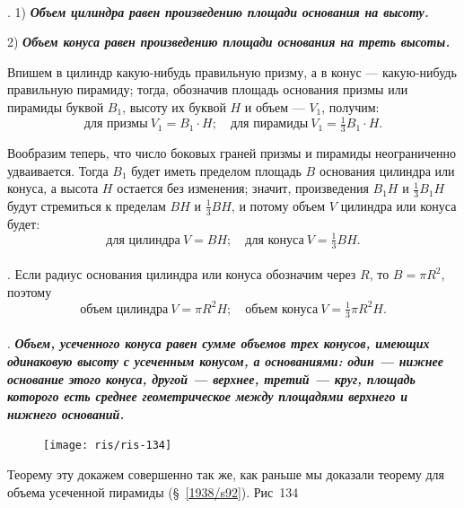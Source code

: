 \documentclass[twoside]{book}
\begin{document}
\paragraph{}\label{1938/s120}
.
1) \textbf{\emph{Объем цилиндра равен произведению площади основания на высоту.}}

2) \textbf{\emph{Объем конуса равен произведению площади основания на треть высоты.}}

Впишем в цилиндр какую-нибудь правильную призму, а в конус --- какую-нибудь правильную пирамиду;
тогда, обозначив площадь основания призмы или пирамиды буквой $B_1$, высоту их буквой $H$ и объем --- $V_1$, получим:
\[
\text{для призмы}\  V_1 = B_1\cdot H;\quad
\text{для пирамиды}\  V_1= \tfrac13 B_1\cdot H.
\]

Вообразим теперь, что число боковых граней призмы и пирамиды неограниченно удваивается.
Тогда $B_1$ будет иметь пределом площадь $B$ основания цилиндра или конуса, а высота $H$ остается без изменения;
значит, произведения $B_1H$ и $\tfrac13B_1H$ будут стремиться к пределам $BH$ и $\tfrac13BH$, и потому объем $V$ цилиндра или конуса будет:
\[
\text{для цилиндра}\  V = B H;\quad
\text{для конуса}\  V= \tfrac13 B H.
\]

\paragraph{}\label{1938/s121}
.
Если радиус основания цилиндра или конуса обозначим через $R$, то $B= \pi R^2$, поэтому 
\[
\text{объем цилиндра}\ V = \pi R^2H;
\quad
\text{объем конуса}\ V = \tfrac13\pi R^2H.\]

\paragraph{}\label{1938/s122}
.
\textbf{\emph{Объем, усеченного конуса равен сумме объемов трех конусов, имеющих одинаковую высоту с усеченным конусом, а основаниями: один --- нижнее основание этого конуса, другой --- верхнее, третий --- круг, площадь которого есть среднее геометрическое между площадями верхнего и нижнего оснований.}}

\begin{figure}[h!]
\centering
\texttt{[image: ris/ris-134]}
\caption{}
\end{figure}

Теорему эту докажем совершенно так же, как раньше мы доказали теорему для объема усеченной пирамиды (§~\ref{1938/s92}). Рис~134
\end{document}

